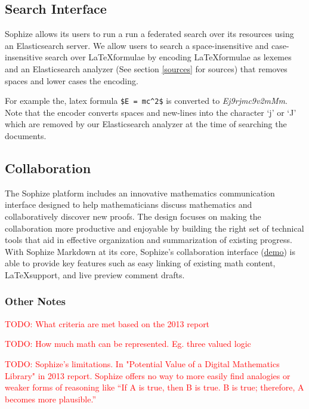 \documentclass[a4paper]{article}
\newcommand\todo[1]{\textcolor{red}{TODO: #1}}
\begin{document}
\subsection{Search Interface}
Sophize allows its users to run a run a federated search over its resources using an Elasticsearch server. We allow users to search a space-insensitive and case-insensitive search over \LaTeX\space formulae by encoding \LaTeX\space formulae as lexemes and an Elasticsearch analyzer (See section \ref{sources} for sources) that removes spaces and lower cases the encoding.

For example the, latex formula \verb+$E = mc^2$+ is converted to \textit{Ej9rjmc9v2mMm}. 
Note that the encoder converts spaces and new-lines into the character `j' or `J' which are removed by our Elasticsearch analyzer at the time of searching the documents.

\subsection{Collaboration}

The Sophize platform includes an innovative mathematics communication interface designed to help
mathematicians discuss mathematics and collaboratively discover new proofs. The design focuses on
making the collaboration more productive and enjoyable by building the right set of technical
tools that aid in effective organization and summarization of existing progress.
With Sophize Markdown at its core, Sophize's collaboration interface\cite{todo}  (\underline{\href{https://youtu.be/d3gaalJ7UQM}{demo}}) is able to provide key features such as easy linking of existing math content, \LaTeX\space support, and live preview comment drafts.


\subsubsection{Other Notes}
\todo{What criteria are met based on the 2013 report}

\todo{How much math can be represented. Eg. three valued logic}

\todo{Sophize's limitations. In "Potential Value of a
Digital Mathematics Library" in 2013 report. Sophize offers no way to more easily find analogies or weaker forms of reasoning like “If A is true, then B is true. B is true; therefore, A becomes more plausible.” }

 


\end{document}
